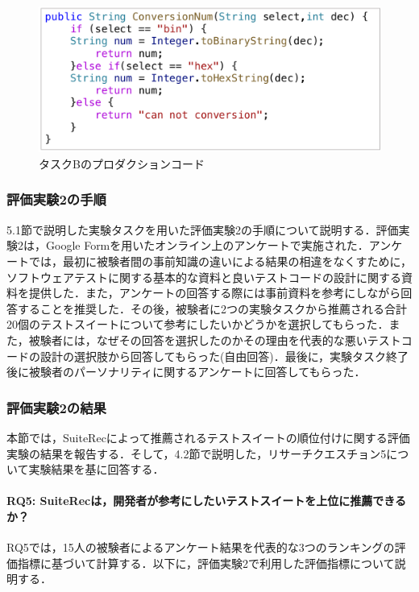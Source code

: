 \documentclass[12pt]{jarticle} %
\begin{document}
\begin{description}
\begin{figure}[htbp]
  \begin{center}
    \includegraphics[clip,width=12cm]{taskB.pdf}
    \caption{タスクBのプロダクションコード}
    \label{E2}
  \end{center}
\end{figure}

\end{description}

\subsubsection{評価実験2の手順}

5.1節で説明した実験タスクを用いた評価実験2の手順について説明する．評価実験2は，Google Formを用いたオンライン上のアンケートで実施された．アンケートでは，最初に被験者間の事前知識の違いによる結果の相違をなくすために，ソフトウェアテストに関する基本的な資料と良いテストコードの設計に関する資料を提供した．また，アンケートの回答する際には事前資料を参考にしながら回答することを推奨した．その後，被験者に2つの実験タスクから推薦される合計20個のテストスイートについて参考にしたいかどうかを選択してもらった．また，被験者には，なぜその回答を選択したのかその理由を代表的な悪いテストコードの設計の選択肢から回答してもらった(自由回答)．最後に，実験タスク終了後に被験者のパーソナリティに関するアンケートに回答してもらった．

\subsubsection{評価実験2の結果}

本節では，{\sf SuiteRec}によって推薦されるテストスイートの順位付けに関する評価実験の結果を報告する．そして，4.2節で説明した，リサーチクエスチョン5について実験結果を基に回答する．

\paragraph{RQ5: SuiteRecは，開発者が参考にしたいテストスイートを上位に推薦できるか？}
RQ5では，15人の被験者によるアンケート結果を代表的な3つのランキングの評価指標に基づいて計算する．以下に，評価実験2で利用した評価指標について説明する．
\end{document}
